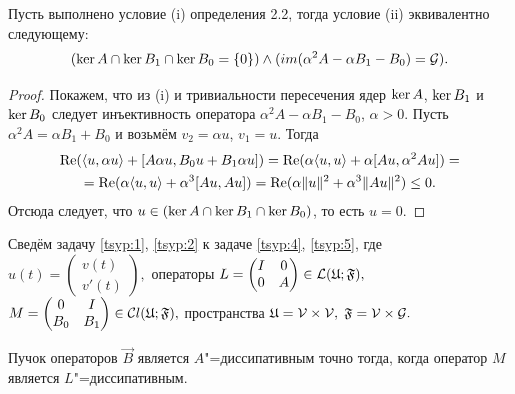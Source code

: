 \smallskip

\begin{lemma}[2.2]Пусть выполнено условие {\rm (i)} определения {\rm 2.2,}
тогда условие {\rm (ii)} эквивалентно следующему\/{\rm:} $$(\mathop{\rm ker} A\cap \mathop{\rm ker}
B_{1}\cap \mathop{\rm ker} B_{0}=\{0\})\wedge (im(\alpha^{2}A-\alpha
B_{1}-B_{0})=\mathcal G).$$ 
\end{lemma}

\smallskip 

\begin{proof}
Покажем, что из (i) и тривиальности пересечения ядер $\mathop{\rm ker} A$, $\mathop{\rm ker}
B_{1}$ и $\mathop{\rm ker} B_{0}$ следует инъективность оператора $\alpha^{2} A-\alpha
 B_{1}-B_{0}$, $\alpha >0.$ 
 Пусть $\alpha^{2} A=\alpha  B_{1}+B_{0}$ и возьмём $v_{2}=\alpha u$, $v_{1}=u$. Тогда
\begin{multline*}
\mathop{\rm Re}(\langle u,\alpha u\rangle+[A\alpha
u,B_{0}u+B_{1}\alpha u])=\mathop{\rm Re}(\alpha\langle u,
u\rangle+\alpha[A u,\alpha^{2} A u])=
\\
=\mathop{\rm Re}(\alpha\langle u, u\rangle+\alpha^{3}[A u, A u])=
\mathop{\rm Re}(\alpha\|u\|^{2}+\alpha^{3}\|A u\|^{2})\leq 0.
\end{multline*}
Отсюда  следует, что $u\in (\mathop{\rm ker} A\cap \mathop{\rm ker} B_{1}\cap \mathop{\rm ker} B_{0})$,
то есть $u=0.$ 
\end{proof}

\smallskip


Сведём задачу \eqref{tsyp:1}, \eqref{tsyp:2} к задаче \eqref{tsyp:4}, \eqref{tsyp:5}, где
$u(t)=\begin{pmatrix} v(t)\\v'(t)\end{pmatrix},$ операторы
\mbox{$L=\begin{pmatrix} I&0\\0&A\end{pmatrix}\in\mathcal L (\frak
U;\frak F),$} $M=\begin{pmatrix}
0&I\\B_{0}&B_{1}\end{pmatrix}\in\mathcal Cl (\frak U;\frak F),$
пространства $\frak U=\mathcal V\times \mathcal V,$ $\frak
F=\mathcal V\times \mathcal G.$

\smallskip

\begin{lemma}[2.3]Пучок операторов $\vec{B}$ является $A$"=диссипативным точно тогда{\rm ,} когда оператор $M$ является $L$"=диссипативным{\rm .}
\end{lemma}

